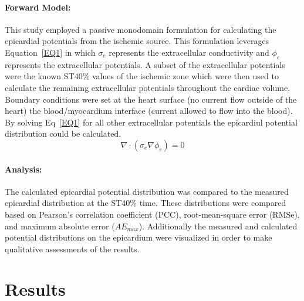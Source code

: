 \documentclass[12pt]{article}
\begin{document}
\paragraph{Forward Model:}
This study employed a passive monodomain formulation for calculating the epicardial potentials from the ischemic source. This formulation leverages Equation~\ref{EQ1} in which $\sigma_e$ represents the extracellular conductivity and $\phi_e$ represents the extracellular potentials. A subset of the extracellular potentials were the known ST40\% values of the ischemic zone which were then used to calculate the remaining extracellular potentials throughout the cardiac volume. Boundary conditions were set at the heart surface (no current flow outside of the heart) the blood/myocardium interface (current allowed to flow into the blood). By solving Eq~\ref{EQ1} for all other extracellular potentials the epicardiul potential distribution could be calculated.
\begin{equation}
\nabla\cdot(\sigma_e\nabla\phi_e) = 0
\label{EQ1}
\end{equation}

\paragraph{Analysis:}
The calculated epicardial potential distribution was compared to the measured epicardial distribution at the ST40\% time. These distributions were compared based on Pearson's correlation coefficient (PCC), root-mean-square error (RMSe), and maximum absolute error ($AE_{max}$). Additionally the measured and calculated potential distributions on the epicardium were visualized in order to make qualitative assessments of the results.

\section{Results}
\end{document}
